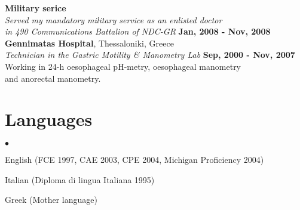 \documentclass[margin,line]{res}
\newenvironment{list2}{
  \begin{list}{$\bullet$}{%
      \setlength{\itemsep}{0in}
      \setlength{\parsep}{0in} \setlength{\parskip}{0in}
      \setlength{\topsep}{0in} \setlength{\partopsep}{0in}
      \setlength{\leftmargin}{0.2in}}}{\end{list}}
\begin{document}
\begin{resume}
{\bf Military serice}\\
{\em Served my mandatory military service as an enlisted doctor\\in 490 Communications Battalion of NDC-GR}
\hfill {\bf Jan, 2008 - Nov, 2008}\\

{\bf Gennimatas Hospital}, Thessaloniki, Greece\\
{\em Technician in the Gastric Motility \& Manometry Lab} \hfill {\bf Sep, 2000 - Nov, 2007}\\
Working in 24-h oesophageal pH-metry, oesophageal manometry\\
and anorectal manometry.

\section{\sc Languages}
\begin{list2}
\item English (FCE 1997, CAE 2003, CPE 2004, Michigan Proficiency 2004)
\item Italian (Diploma di lingua Italiana 1995)
\item Greek (Mother language)
\end{list2}


\end{resume}
\end{document}
